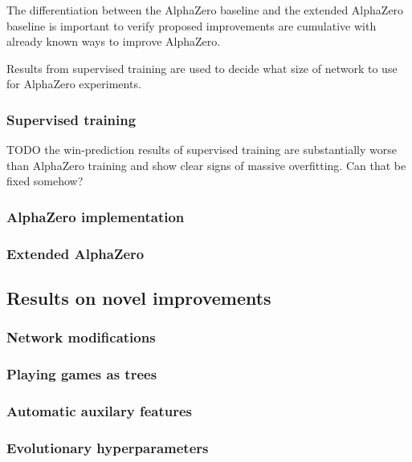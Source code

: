 \documentclass[12pt,onecolumn,oneside,titlepage]{article}
\begin{document}
The differentiation between the AlphaZero baseline and the extended AlphaZero baseline is important to verify proposed improvements are cumulative with already known ways to improve AlphaZero.

Results from supervised training are used to decide what size of network to use for AlphaZero experiments.

\subsubsection{Supervised training}

TODO the win-prediction results of supervised training are substantially worse than AlphaZero training and show clear signs of massive overfitting. Can that be fixed somehow?

\subsubsection{AlphaZero implementation}
\subsubsection{Extended AlphaZero} \label{s:exexp}


\subsection{Results on novel improvements}
\subsubsection{Network modifications}
\subsubsection{Playing games as trees}
\subsubsection{Automatic auxilary features}
\subsubsection{Evolutionary hyperparameters}






\pagebreak




\end{document}
